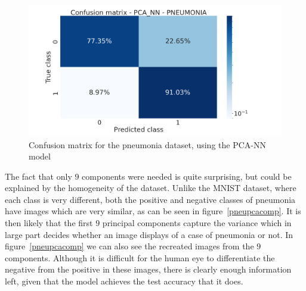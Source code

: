\documentclass[onecolumn,10pt,cleanfoot]{asme2ej}
\begin{document}
\begin{figure}[H]
\centerline{\includegraphics[width=5in]{figure/conf_pca_nn_pneu.png}}
\caption{Confusion matrix for the pneumonia dataset, using the PCA-NN model}
\label{conf_pca_nn_pneu}
\end{figure}

The fact that only $9$ components were needed is quite surprising, but could be explained by the homogeneity of the dataset. Unlike the MNIST dataset, where each class is very different, both the positive and negative classes of pneumonia have images which are very similar, as can be seen in figure~\ref{pneupcacomp}. It is then likely that the first $9$ principal components capture the variance which in large part decides whether an image displays of a case of pneumonia or not. In figure~\ref{pneupcacomp} we can also see the recreated images from the $9$ components. Although it is difficult for the human eye to differentiate the negative from the positive in these images, there is clearly enough information left, given that the model achieves the test accuracy that it does.
\end{document}

